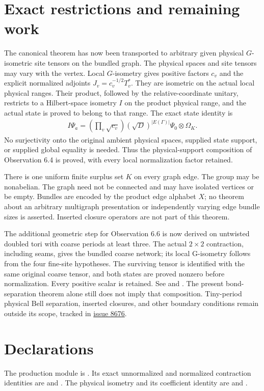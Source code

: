 \documentclass{article}
\begin{document}
\section{Exact restrictions and remaining work}
The canonical theorem has now been transported to arbitrary given physical
$G$-isometric site tensors on the bundled graph. The physical spaces and site
tensors may vary with the vertex. Local $G$-isometry gives positive factors
$c_v$ and the explicit normalized adjoints $J_v=c_v^{-1/2}T_v^*$.
They are isometric on the actual local physical ranges. Their product,
followed by the relative-coordinate unitary, restricts to a Hilbert-space
isometry $I$ on the product physical range, and the actual state is proved
to belong to that range. The exact state identity is
\begin{align}
 I\Psi_a=\left(\prod_v\sqrt{c_v}\right)
    (\sqrt D)^{|E(\Gamma)|}\Psi_0\otimes\Omega_K.
\end{align}
No surjectivity onto the original ambient physical spaces, supplied state
support, or supplied global equality is needed. Thus the physical-support
composition of Observation 6.4 is proved, with every local normalization
factor retained.

There is one uniform finite surplus set $K$ on every graph edge. The group
may be nonabelian. The graph need not be connected and may have isolated
vertices or be empty. Bundles are encoded by the product edge alphabet $X$;
no theorem about an arbitrary multigraph presentation or independently
varying edge bundle sizes is asserted. Inserted closure operators are not
part of this theorem.

The additional geometric step for Observation 6.6 is now derived on
untwisted doubled tori with coarse periods at least three. The actual
$2\times2$ contraction, including seams, gives the bundled coarse network;
its local G-isometry follows from the four fine-site hypotheses. The
surviving tensor is identified with the same original coarse tensor, and
both states are proved nonzero before normalization. Every positive scalar
is retained. See
 and
.
The present bond-separation theorem alone still does not imply that
composition. Tiny-period physical Bell separation, inserted closures,
and other boundary conditions remain outside its scope, tracked in
\href{https://github.com/LionSR/TNLean/issues/8676}{issue 8676}.

\section{Declarations}
The production module is
.
Its exact unnormalized and normalized contraction identities are
 and
.
The physical isometry and its coefficient identity are
 and
.
\end{document}

